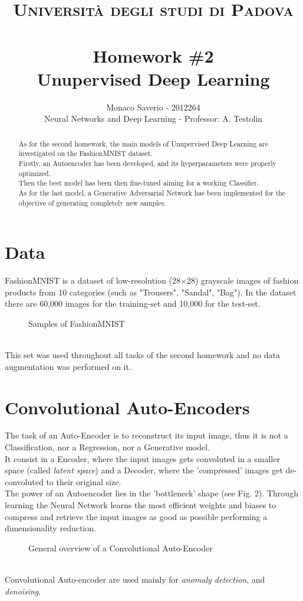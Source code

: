 \documentclass[11pt,a4paper,twocolumn]{IEEEtran}
\author{Monaco Saverio - 2012264 \sepline \\Neural Networks and Deep Learning - Professor: A. Testolin}
\title{{\normalsize\textsc{Università degli studi di Padova}}\vspace{-.5cm} \\ \sepline\\ \textbf{Homework \#2
\\ Unupervised Deep Learning}}
\begin{document}
	\maketitle
	\begin{abstract} As for the second homework, the main models of Unupervised Deep Learning are investigated on the FashionMNIST dataset.\\ 
	Firstly, an Autoencoder has been developed, and its hyperparameters were properly optimized.\\ Then the best model has been then fine-tuned aiming for a working Classifier.\\
	As for the last model, a Generative Adversarial Network has been implemented for the objective of generating completely new samples.
	\end{abstract}
	\section*{Data}
	FashionMNIST is a dataset of low-resolution (28$\times$28) grayscale images of fashion products from 10 categories (such as "Trousers", "Sandal", "Bag"). In the dataset there are 60,000 images for the training-set and 10,000 for the test-set.\vspace*{-.5cm}
	\begin{figure}[h]
		\centering
		
		\caption{Samples of FashionMNIST}
	\end{figure}\\
	This set was used throughout all tasks of the second homework and no data augmentation was performed on it.
	\section{\textbf{Convolutional Auto-Encoders}}
	The task of an Auto-Encoder is to reconstruct its input image, thus it is not a Classification, nor a Regression, nor a Generative model.\\
	It consist in a Encoder, where the input images gets convoluted in a smaller space (called \textit{latent space}) and a Decoder, where the 'compressed' images get de-convoluted to their original size.\\ The power of an Autoencoder lies in the 'bottleneck' shape (see Fig. 2). Through learning the Neural Network learns the most efficient weights and biases to compress and retrieve the input images as good as possible performing a dimensionality reduction.	
		\begin{figure}[h]
			\centering
			{\scriptsize
			 }
			\caption{General overview of a Convolutional Auto-Encoder}
		\end{figure}\\
	Convolutional Auto-encoder are used mainly for \textit{anomaly detection}, and \textit{denoising}.
\end{document}
